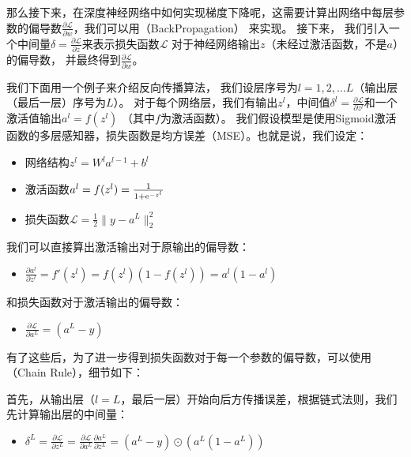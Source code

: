 \documentclass[letterpaper,10pt,english]{sphinxmanual}
\begin{document}
\sphinxAtStartPar
那么接下来，在深度神经网络中如何实现梯度下降呢，这需要计算出网络中每层参数的偏导数\(\frac{\partial \mathcal{L}}{\partial {w}}\)，我们可以用（Back\sphinxhyphen{}Propagation）
来实现。 接下来，
我们引入一个中间量\({\delta}=\frac{\partial \mathcal{L}}{\partial {z}}\)来表示损失函数\(\mathcal{L}\)
对于神经网络输出\({z}\)（未经过激活函数，不是\(a\)）的偏导数，
并最终得到\(\frac{\partial \mathcal{L}}{\partial {w}}\)。

\sphinxAtStartPar
我们下面用一个例子来介绍反向传播算法，
我们设层序号为\(l=1, 2, \ldots L\)（输出层（最后一层）序号为\(L\)）。
对于每个网络层，我们有输出\({z}^l\)，中间值\({\delta}^l=\frac{\partial \mathcal{L}}{\partial {z}^l}\)和一个激活值输出\({a}^l=f({z}^l)\)
（其中\(f\)为激活函数）。
我们假设模型是使用Sigmoid激活函数的多层感知器，损失函数是均方误差（MSE）。也就是说，我们设定：
\begin{itemize}
\item {} 
\sphinxAtStartPar
网络结构\({z}^{l}={W}^{l}{a}^{l-1}+{b}^{l}\)

\item {} 
\sphinxAtStartPar
激活函数\({a}^l=f({z}^l)=\frac{1}{1+{\rm e}^{-{z}^l}}\)

\item {} 
\sphinxAtStartPar
损失函数\(\mathcal{L}=\frac{1}{2}\|{y}-{a}^{L}\|^2_2\)

\end{itemize}

\sphinxAtStartPar
我们可以直接算出激活输出对于原输出的偏导数：
\begin{itemize}
\item {} 
\sphinxAtStartPar
\(\frac{\partial {a}^l}{\partial {z}^l}=f'({z}^l)=f({z}^l)(1-f({z}^l))={a}^l(1-{a}^l)\)

\end{itemize}

\sphinxAtStartPar
和损失函数对于激活输出的偏导数：
\begin{itemize}
\item {} 
\sphinxAtStartPar
\(\frac{\partial \mathcal{L}}{\partial {a}^{L}}=({a}^{L}-{y})\)

\end{itemize}

\sphinxAtStartPar
有了这些后，为了进一步得到损失函数对于每一个参数的偏导数，可以使用（Chain
Rule），细节如下：

\sphinxAtStartPar
首先，从输出层（\(l=L\)，最后一层）开始向后方传播误差，根据链式法则，我们先计算输出层的中间量：
\begin{itemize}
\item {} 
\sphinxAtStartPar
\({\delta}^{L} =\frac{\partial \mathcal{L}}{\partial {z}^{L}} =\frac{\partial \mathcal{L}}{\partial {a}^{L}}\frac{\partial {a}^L}{\partial {z}^{L}}=({a}^L-{y})\odot({a}^L(1-{a}^L))\)

\end{itemize}
\end{document}
